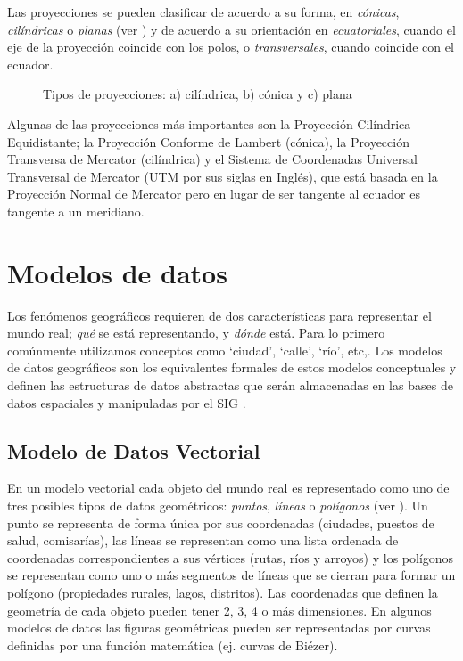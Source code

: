 Las proyecciones se pueden clasificar de acuerdo a su forma, en \emph{cónicas}, \emph{cilíndricas} o \emph{planas} (ver ) y de acuerdo a su orientación en \emph{ecuatoriales}, cuando el eje de la proyección coincide con los polos, o \emph{transversales}, cuando coincide con el ecuador.

\begin{figure}[h]
	\centering
	
	\caption[Tipos de proyecciones por forma]{Tipos de proyecciones: a) cilíndrica, b) cónica y c) plana}
	\label{fig:tipos-proyecciones} 
\end{figure}

Algunas de las proyecciones más importantes son la Proyección Cilíndrica Equidistante; la Proyección Conforme de Lambert (cónica), la Proyección Transversa de Mercator (cilíndrica) y el Sistema de Coordenadas Universal Transversal de Mercator (UTM por sus siglas en Inglés), que está basada en la Proyección Normal de Mercator pero en lugar de ser tangente al ecuador es tangente a un meridiano.

\section{Modelos de datos}

Los fenómenos geográficos requieren de dos características para representar el mundo real; \emph{qué} se está representando, y \emph{dónde} está. Para lo primero comúnmente utilizamos conceptos como `ciudad', `calle', `río', etc,. Los modelos de datos geográficos son los equivalentes formales de estos modelos conceptuales y definen las estructuras de datos abstractas que serán almacenadas en las bases de datos espaciales y manipuladas por el SIG \cite{burrough1998principles}.

\subsection{Modelo de Datos Vectorial}

En un modelo vectorial cada objeto del mundo real es representado como uno de tres posibles tipos de datos geométricos: \emph{puntos}, \emph{líneas} o \emph{polígonos} (ver ). Un punto se representa de forma única por sus coordenadas (ciudades, puestos de salud, comisarías), las líneas se representan como una lista ordenada de coordenadas correspondientes a sus vértices (rutas, ríos y arroyos) y los polígonos se representan como uno o más segmentos de líneas que se cierran para formar un polígono (propiedades rurales, lagos, distritos). Las coordenadas que definen la geometría de cada objeto pueden tener 2, 3, 4 o más dimensiones. En algunos modelos de datos las figuras geométricas pueden ser representadas por curvas definidas por una función matemática (ej. curvas de Biézer).

